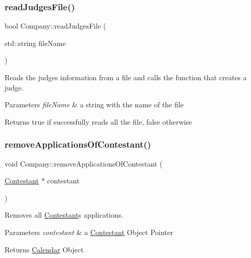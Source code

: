 \subsubsection{\texorpdfstring{read\+Judges\+File()}{readJudgesFile()}}
{\footnotesize\ttfamily bool Company\+::read\+Judges\+File (\begin{DoxyParamCaption}\item[{std\+::string}]{file\+Name }\end{DoxyParamCaption})}



Reads the judges information from a file and calls the function that creates a judge. 


\begin{DoxyParams}{Parameters}
{\em file\+Name} & a string with the name of the file \\
\hline
\end{DoxyParams}
\begin{DoxyReturn}{Returns}
true if successfully reads all the file, false otherwise 
\end{DoxyReturn}
\mbox{\label{class_company_a60f441b02e7db24f47b82e4dcd1a1e17}} 
\subsubsection{\texorpdfstring{remove\+Applications\+Of\+Contestant()}{removeApplicationsOfContestant()}}
{\footnotesize\ttfamily void Company\+::remove\+Applications\+Of\+Contestant (\begin{DoxyParamCaption}\item[{\hyperlink{class_contestant}{Contestant} $\ast$}]{contestant }\end{DoxyParamCaption})}



Removes all \hyperlink{class_contestant}{Contestant}\textquotesingle{}s applications. 


\begin{DoxyParams}{Parameters}
{\em contestant} & a \hyperlink{class_contestant}{Contestant} Object Pointer \\
\hline
\end{DoxyParams}
\begin{DoxyReturn}{Returns}
\hyperlink{class_calendar}{Calendar} Object 
\end{DoxyReturn}
\mbox{\label{class_company_a6001cfc0c20bf5037345b4ccd3dc7840}} 
